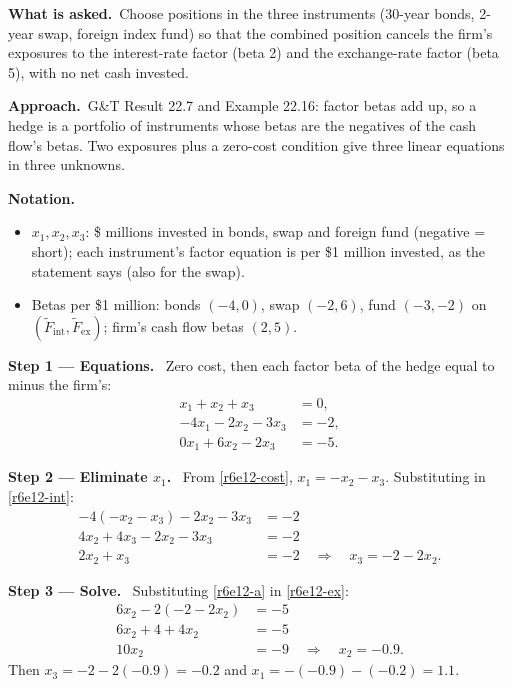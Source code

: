 \documentclass[11pt,a4paper]{article}
\newcommand{\notation}{\par\noindent\textbf{Notation.}}
\newcommand{\step}[2]{\par\medskip\noindent\textbf{Step #1 --- #2.}~}
\newcommand{\asked}{\par\medskip\noindent\textbf{What is asked.}~}
\newcommand{\approach}{\par\smallskip\noindent\textbf{Approach.}~}
\begin{document}
\asked Choose positions in the three instruments (30-year bonds, 2-year swap, foreign index fund) so that the combined position cancels the firm's exposures to the interest-rate factor (beta 2) and the exchange-rate factor (beta 5), with no net cash invested.

\approach G\&T Result 22.7 and Example 22.16: factor betas add up, so a hedge is a portfolio of instruments whose betas are the negatives of the cash flow's betas. Two exposures plus a zero-cost condition give three linear equations in three unknowns.

\notation
\begin{itemize}
  \item $x_1,x_2,x_3$: \$ millions invested in bonds, swap and foreign fund (negative = short); each instrument's factor equation is per \$1 million invested, as the statement says (also for the swap).
  \item Betas per \$1 million: bonds $(-4,0)$, swap $(-2,6)$, fund $(-3,-2)$ on $(\tilde F_{\text{int}},\tilde F_{\text{ex}})$; firm's cash flow betas $(2,5)$.
\end{itemize}

\step{1}{Equations} Zero cost, then each factor beta of the hedge equal to minus the firm's:
\begin{align}
  x_1+x_2+x_3 &= 0, \label{r6e12-cost}\\
  -4x_1-2x_2-3x_3 &= -2, \label{r6e12-int}\\
  0x_1+6x_2-2x_3 &= -5. \label{r6e12-ex}
\end{align}

\step{2}{Eliminate $x_1$} From \eqref{r6e12-cost}, $x_1=-x_2-x_3$. Substituting in \eqref{r6e12-int}:
\begin{align}
  -4(-x_2-x_3)-2x_2-3x_3 &= -2 \nonumber\\
  4x_2+4x_3-2x_2-3x_3 &= -2 \nonumber\\
  2x_2+x_3 &= -2 \quad\Longrightarrow\quad x_3=-2-2x_2. \label{r6e12-a}
\end{align}

\step{3}{Solve} Substituting \eqref{r6e12-a} in \eqref{r6e12-ex}:
\begin{align}
  6x_2-2(-2-2x_2) &= -5 \nonumber\\
  6x_2+4+4x_2 &= -5 \nonumber\\
  10x_2 &= -9 \quad\Longrightarrow\quad x_2=-0.9. \nonumber
\end{align}
Then $x_3=-2-2(-0.9)=-0.2$ and $x_1=-(-0.9)-(-0.2)=1.1$.
\end{document}
